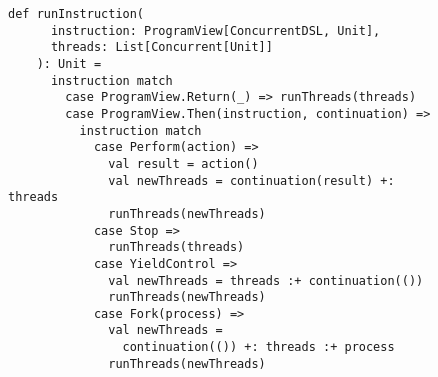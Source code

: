 \begin{figure}[htp]
  \begin{lstlisting}[language=scala3, caption={Implementazione della funzione \lstinline{runInstructions}.}, label={lst:run-instructions}]
    def runInstruction(
      instruction: ProgramView[ConcurrentDSL, Unit],
      threads: List[Concurrent[Unit]]
    ): Unit =
      instruction match
        case ProgramView.Return(_) => runThreads(threads)
        case ProgramView.Then(instruction, continuation) =>
          instruction match
            case Perform(action) =>
              val result = action()
              val newThreads = continuation(result) +: threads
              runThreads(newThreads)
            case Stop =>
              runThreads(threads)
            case YieldControl =>
              val newThreads = threads :+ continuation(())
              runThreads(newThreads)
            case Fork(process) =>
              val newThreads =
                continuation(()) +: threads :+ process
              runThreads(newThreads)
  \end{lstlisting}
\end{figure}





